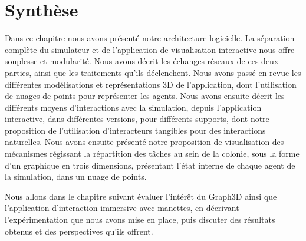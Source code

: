 	
	
			
	\section*{Synthèse}
	Dans ce chapitre nous avons présenté notre architecture logicielle. La séparation complète du simulateur et de l'application de visualisation interactive nous offre souplesse et modularité. Nous avons décrit les échanges réseaux de ces deux parties, ainsi que les traitements qu'ils déclenchent. Nous avons passé en revue les différentes modélisations et représentations 3D de l'application, dont l'utilisation de nuages de points pour représenter les agents. Nous avons ensuite décrit les différents moyens d'interactions avec la simulation, depuis l'application interactive, dans différentes versions, pour différents supports, dont notre proposition de l'utilisation d'interacteurs tangibles pour des interactions naturelles.
	Nous avons ensuite présenté notre proposition de visualisation des mécanismes régissant la répartition des tâches au sein de la colonie, sous la forme d'un graphique en trois dimensions, présentant l'état interne de chaque agent de la simulation, dans un nuage de points.
	
	 Nous allons dans le chapitre suivant évaluer l'intérêt du Graph3D ainsi que l'application d'interaction immersive avec manettes, en décrivant l'expérimentation que nous avons mise en place, puis discuter des résultats obtenus et des perspectives qu'ils offrent.
	